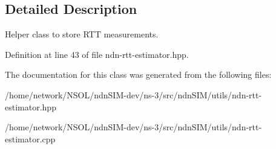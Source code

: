 \subsection{Detailed Description}
Helper class to store R\+TT measurements. 

Definition at line 43 of file ndn-\/rtt-\/estimator.\+hpp.



The documentation for this class was generated from the following files\+:\begin{DoxyCompactItemize}
\item 
/home/network/\+N\+S\+O\+L/ndn\+S\+I\+M-\/dev/ns-\/3/src/ndn\+S\+I\+M/utils/ndn-\/rtt-\/estimator.\+hpp\item 
/home/network/\+N\+S\+O\+L/ndn\+S\+I\+M-\/dev/ns-\/3/src/ndn\+S\+I\+M/utils/ndn-\/rtt-\/estimator.\+cpp\end{DoxyCompactItemize}
